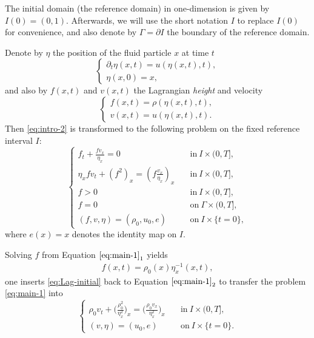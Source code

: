 \documentclass[11pt, reqno]{amsart}
\numberwithin{equation}{section}
\begin{document}
The initial domain (the reference domain) in one-dimension is given by \(I(0)=(0,1)\). Afterwards, we will use the short notation \(I\) to replace \(I(0)\) for convenience, and also denote by \(\Gamma=\partial I\) the boundary of the reference domain.

Denote by \(\eta\) the position of the fluid particle \(x\) at time \(t\)
\begin{equation}\label{fluid particle}
\begin{cases}
\partial_t\eta(x,t)=u(\eta(x,t),t),\\
\eta(x,0)=x,
\end{cases}
\end{equation}
and also by \(f(x,t)\) and \(v(x,t)\) the Lagrangian \emph{height} and velocity
\begin{equation}\label{Lagrangian variable}
\begin{cases}
f(x,t)=\rho(\eta(x,t),t),\\
v(x,t)=u(\eta(x,t),t).
\end{cases}
\end{equation}
Then  \eqref{eq:intro-2} is transformed to the following problem on the fixed reference interval \(I\):
\begin{equation}\label{eq:main-1}
\begin{cases}
f_t+{\frac{fv_x}{\eta_x}}=0 &\quad \text{in}\ I\times (0,T],\\
\eta_xfv_t+(f^2)_x=(f{\frac{v_x}{\eta_x}})_x &\quad \text{in}\ I\times (0,T],\\
f>0 &\quad \text{in}\ I\times (0,T],\\
f=0 &\quad \text{on}\ \Gamma\times (0,T],\\
(f,v,\eta)=(\rho_0,u_0,e) &\quad \text{on}\ I\times \{t=0\},
\end{cases}
\end{equation}
where \(e(x)=x\) denotes the identity map on \(I\).



Solving \(f\) from Equation \(\eqref{eq:main-1}_1\) yields
\begin{align}\label{eq:Lag-initial}
f(x,t)=\rho_0(x)\eta_x^{-1}(x,t),
\end{align}
one inserts \eqref{eq:Lag-initial} back to Equation \(\eqref{eq:main-1}_2\) to transfer the problem \eqref{eq:main-1} into
\begin{equation}\label{eq:main-2}
\begin{cases}
\rho_0v_t+\big({\frac{\rho_0^2}{\eta_x^2}}\big)_x
=\big(\frac{\rho_0v_x}{\eta_x^2}\big)_x &\quad \mbox{in}\ I\times (0,T],\\
(v,\eta)=(u_0,e) &\quad \mbox{on}\ I\times \{t=0\}.
\end{cases}
\end{equation}
\end{document}
